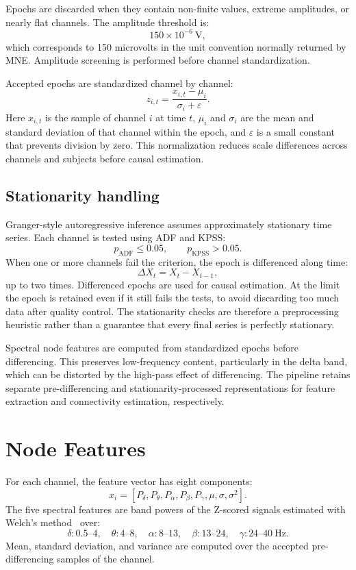 \documentclass[11pt,a4paper]{article}
\begin{document}
Epochs are discarded when they contain non-finite values, extreme amplitudes,
or nearly flat channels. The amplitude threshold is:
\[
    150\times10^{-6}\ \mathrm{V},
\]
which corresponds to 150 microvolts in the unit convention normally returned
by MNE. Amplitude screening is performed before channel standardization.

Accepted epochs are standardized channel by channel:
\[
    z_{i,t}=\frac{x_{i,t}-\mu_i}{\sigma_i+\varepsilon}.
\]
Here $x_{i,t}$ is the sample of channel $i$ at time $t$, $\mu_i$ and
$\sigma_i$ are the mean and standard deviation of that channel within the
epoch, and $\varepsilon$ is a small constant that prevents division by zero.
This normalization reduces scale differences across channels and subjects
before causal estimation.

\subsection{Stationarity handling}

Granger-style autoregressive inference assumes approximately stationary time
series. Each channel is tested using ADF and KPSS:
\[
    p_{\mathrm{ADF}}\leq0.05,\qquad p_{\mathrm{KPSS}}>0.05.
\]
When one or more channels fail the criterion, the epoch is differenced along
time:
\[
    \Delta X_t=X_t-X_{t-1},
\]
up to two times. Differenced epochs are used for causal estimation.
At the limit the epoch is retained even if it still fails the tests, to avoid
discarding too much data after quality control. The stationarity checks are
therefore a preprocessing heuristic rather than a guarantee that every final
series is perfectly stationary.

Spectral node features are computed from standardized epochs before
differencing. This preserves low-frequency content, particularly in the
delta band, which can be distorted by the high-pass effect of differencing.
The pipeline retains separate pre-differencing and stationarity-processed
representations for feature extraction and connectivity estimation,
respectively.

\section{Node Features}

For each channel, the feature vector has eight components:
\[
    x_i =
    [P_\delta,P_\theta,P_\alpha,P_\beta,P_\gamma,\mu,\sigma,\sigma^2].
\]
The five spectral features are band powers of the Z-scored signals estimated
with Welch's method~\cite{welch1967} over:
\[
\delta:0.5\text{--}4,\quad
\theta:4\text{--}8,\quad
\alpha:8\text{--}13,\quad
\beta:13\text{--}24,\quad
\gamma:24\text{--}40\ \mathrm{Hz}.
\]
Mean, standard deviation, and variance are computed over the accepted
pre-differencing samples of the channel.
\end{document}
